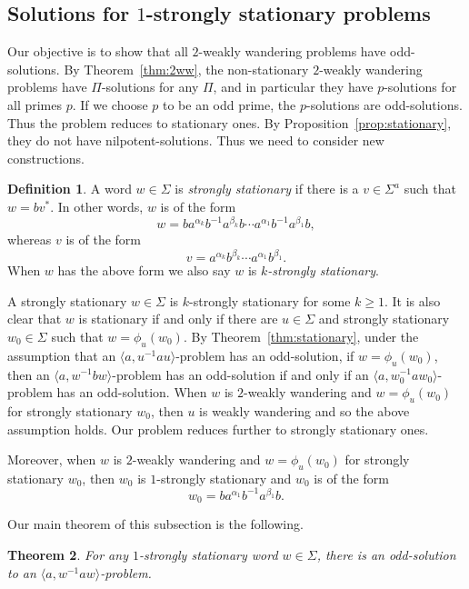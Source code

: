 \documentclass[11pt]{amsart}
\newtheorem{theorem}{Theorem}[section]
\theoremstyle{definition}
\newtheorem{definition}[theorem]{Definition}
\theoremstyle{definition}
\numberwithin{equation}{section}
\begin{document}
\subsection{Solutions for $1$-strongly stationary problems\label{subsec:1ss}}

Our objective is to show that all $2$-weakly wandering problems have odd-solutions. By Theorem~\ref{thm:2ww}, the non-stationary $2$-weakly wandering problems have $\Pi$-solutions for any $\Pi$, and in particular they have $p$-solutions for all primes $p$. If we choose $p$ to be an odd prime, the $p$-solutions are odd-solutions. Thus the problem reduces to stationary ones. By Proposition~\ref{prop:stationary}, they do not have nilpotent-solutions. Thus we need to consider new constructions.

\begin{definition} A word $w\in \Sigma$ is {\em strongly stationary} if there is a $v\in \Sigma^a$ such that $w=bv^*$. In other words, $w$ is of the form
$$ w=ba^{\alpha_k}b^{-1}a^{\beta_k}b\cdots a^{\alpha_1}b^{-1}a^{\beta_1}b, $$
whereas $v$ is of the form
$$ v=a^{\alpha_k}b^{\beta_k}\cdots a^{\alpha_1}b^{\beta_1}. $$
When $w$ has the above form we also say $w$ is {\em $k$-strongly stationary}.
\end{definition}

A strongly stationary $w\in \Sigma$ is $k$-strongly stationary for some $k\geq 1$. It is also clear that $w$ is stationary if and only if there are $u\in \Sigma$ and strongly stationary $w_0\in\Sigma$ such that $w=\phi_u(w_0)$.  By Theorem~\ref{thm:stationary}, under the assumption that an $\langle a, u^{-1}au\rangle$-problem has an odd-solution, if $w=\phi_u(w_0)$, then an $\langle a, w^{-1}bw\rangle$-problem has an odd-solution if and only if an $\langle a, w_0^{-1}aw_0\rangle$-problem has an odd-solution. 
When $w$ is $2$-weakly wandering and $w=\phi_u(w_0)$ for strongly stationary $w_0$, then $u$ is weakly wandering and so the above assumption holds. Our problem reduces further to strongly stationary ones.

Moreover, when $w$ is $2$-weakly wandering and $w=\phi_u(w_0)$ for strongly stationary $w_0$, then $w_0$ is $1$-strongly stationary and $w_0$ is of the form
$$ w_0=ba^{\alpha_1}b^{-1}a^{\beta_1}b. $$

Our main theorem of this subsection is the following.

\begin{theorem}\label{thm:1ss} For any $1$-strongly stationary word $w\in \Sigma$, there is an odd-solution to an $\langle a, w^{-1}aw\rangle$-problem.
\end{theorem}
\end{document}
